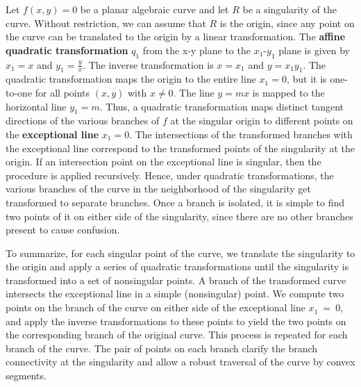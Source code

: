 Let $f(x,y)=0$ be a planar algebraic curve and let $R$ be a singularity of 
the curve.
Without restriction, we can assume that $R$ is the origin, since any point on the curve 
can be translated to the origin by a linear transformation.
The {\bf affine quadratic transformation} $q_{1}$ from the x-y plane 
to the $x_{1}$-$y_{1}$ plane is given by $x_{1} =x$ and $y_{1} = \frac{y}{x}$.
The inverse transformation is $x = x_{1}$ and $y = x_{1}y_{1}$. 
The quadratic transformation
maps the origin to the entire line $x_{1} = 0$, but it is
one-to-one for all points $(x,y)$ with $x \neq 0$. 
The line $y = mx$ is mapped to the horizontal line $y_{1}= m$.
Thus, a quadratic transformation maps distinct tangent directions of the
various branches of $f$ at the singular origin to different
points on the {\bf exceptional line} $x_{1} =0$.
The intersections of the transformed branches with the exceptional
line correspond to the transformed points of the singularity at the origin.
If an intersection point on the exceptional line is singular, 
then the procedure is applied recursively.
Hence, under quadratic transformations, the various branches of the 
curve in the neighborhood of the singularity get transformed to separate
branches.
Once a branch is isolated, it is simple to find two points of it
on either side of the singularity, since there are no other branches
present to cause confusion. 

To summarize, for each singular point of the curve, we translate 
the singularity to the origin
and apply a series of quadratic transformations until the singularity is 
transformed into a set of nonsingular points.
A branch of the transformed curve intersects the exceptional line
in a simple (nonsingular) point.
We compute two points on the branch of the curve on either side of 
the exceptional line $x_{1} ~=~ 0$, and
apply the inverse transformations to these points
to yield the two points on the corresponding branch of the original curve. 
This process is repeated for each branch of the curve.
The pair of points on each branch clarify the branch connectivity at the 
singularity  and allow a robust traversal of the curve by convex segments.
%
%
